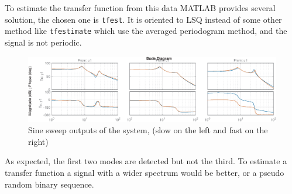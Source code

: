 \documentclass[twosided,a4paper]{article}           %
\begin{document}
To estimate the transfer function from this data MATLAB provides several solution, the chosen one is
\texttt{tfest}. It is oriented to LSQ instead of some other method like \texttt{tfestimate}  which use the averaged periodogram method, and the signal is not periodic.
\begin{figure}[H]
	\centering
	\includegraphics[width=\linewidth]{img/ssbode1}
	\caption{Sine sweep outputs of the system, (slow on the left and fast on the right)}
	\label{fig:ssbode1}
\end{figure}
As expected, the first two modes are detected but not the third. To estimate a transfer function a signal with a wider spectrum would be better, or a pseudo random binary sequence.





\end{document}
